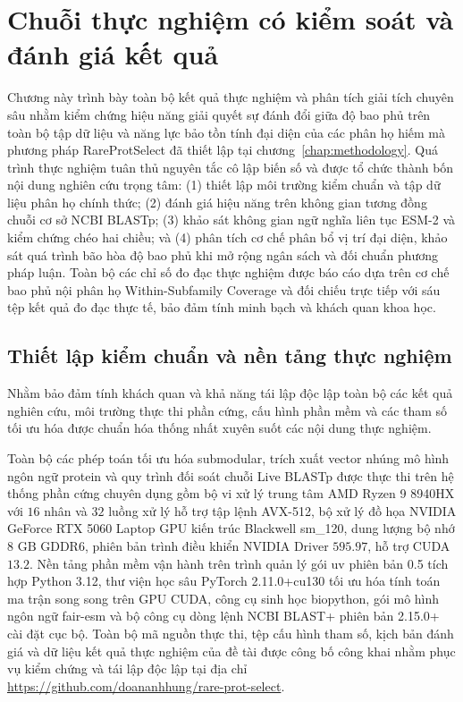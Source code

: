 \chapter{Chuỗi thực nghiệm có kiểm soát và đánh giá kết quả}
\label{chap:experiments}

Chương này trình bày toàn bộ kết quả thực nghiệm và phân tích giải tích chuyên sâu nhằm kiểm chứng hiệu năng giải quyết sự đánh đổi giữa độ bao phủ trên toàn bộ tập dữ liệu và năng lực bảo tồn tính đại diện của các phân họ hiếm mà phương pháp RareProtSelect đã thiết lập tại chương~\ref{chap:methodology}. Quá trình thực nghiệm tuân thủ nguyên tắc cô lập biến số và được tổ chức thành bốn nội dung nghiên cứu trọng tâm: (1) thiết lập môi trường kiểm chuẩn và tập dữ liệu phân họ chính thức; (2) đánh giá hiệu năng trên không gian tương đồng chuỗi cơ sở NCBI BLASTp; (3) khảo sát không gian ngữ nghĩa liên tục ESM-2 và kiểm chứng chéo hai chiều; và (4) phân tích cơ chế phân bổ vị trí đại diện, khảo sát quá trình bão hòa độ bao phủ khi mở rộng ngân sách và đối chuẩn phương pháp luận. Toàn bộ các chỉ số đo đạc thực nghiệm được báo cáo dựa trên cơ chế bao phủ nội phân họ Within-Subfamily Coverage và đối chiếu trực tiếp với sáu tệp kết quả đo đạc thực tế, bảo đảm tính minh bạch và khách quan khoa học.

\section{Thiết lập kiểm chuẩn và nền tảng thực nghiệm}
\label{sec:exp_setup}
\label{subsec:hardware_software_setup}
\label{subsec:curated_ground_set_budget}

Nhằm bảo đảm tính khách quan và khả năng tái lập độc lập toàn bộ các kết quả nghiên cứu, môi trường thực thi phần cứng, cấu hình phần mềm và các tham số tối ưu hóa được chuẩn hóa thống nhất xuyên suốt các nội dung thực nghiệm.

Toàn bộ các phép toán tối ưu hóa submodular, trích xuất vector nhúng mô hình ngôn ngữ protein và quy trình đối soát chuỗi Live BLASTp được thực thi trên hệ thống phần cứng chuyên dụng gồm bộ vi xử lý trung tâm AMD Ryzen 9 8940HX với $16$ nhân và $32$ luồng xử lý hỗ trợ tập lệnh AVX-512, bộ xử lý đồ họa NVIDIA GeForce RTX 5060 Laptop GPU kiến trúc Blackwell sm\_120, dung lượng bộ nhớ $8\text{ GB}$ GDDR6, phiên bản trình điều khiển NVIDIA Driver $595.97$, hỗ trợ CUDA $13.2$. Nền tảng phần mềm vận hành trên trình quản lý gói uv phiên bản 0.5 tích hợp Python 3.12, thư viện học sâu PyTorch 2.11.0+cu130 tối ưu hóa tính toán ma trận song song trên GPU CUDA, công cụ sinh học biopython, gói mô hình ngôn ngữ fair-esm và bộ công cụ dòng lệnh NCBI BLAST+ phiên bản 2.15.0+ cài đặt cục bộ. Toàn bộ mã nguồn thực thi, tệp cấu hình tham số, kịch bản đánh giá và dữ liệu kết quả thực nghiệm của đề tài được công bố công khai nhằm phục vụ kiểm chứng và tái lập độc lập tại địa chỉ \url{https://github.com/doananhhung/rare-prot-select}.

